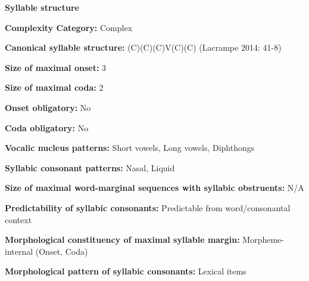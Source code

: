 \begin{styleBody}
\textbf{Syllable structure}
\end{styleBody}

\begin{styleBody}
\textbf{Complexity Category:} Complex
\end{styleBody}

\begin{styleBody}
\textbf{Canonical syllable structure:} (C)(C)(C)V(C)(C)\textbf{ }(Lacrampe 2014: 41-8)
\end{styleBody}

\begin{styleBody}
\textbf{Size of maximal onset:} 3
\end{styleBody}

\begin{styleBody}
\textbf{Size of maximal coda:} 2
\end{styleBody}

\begin{styleBody}
\textbf{Onset obligatory:} No
\end{styleBody}

\begin{styleBody}
\textbf{Coda obligatory:} No
\end{styleBody}

\begin{styleBody}
\textbf{Vocalic nucleus patterns:} Short vowels, Long vowels, Diphthongs
\end{styleBody}

\begin{styleBody}
\textbf{Syllabic consonant patterns:} Nasal, Liquid
\end{styleBody}

\begin{styleBody}
\textbf{Size of maximal word{}-marginal sequences with syllabic obstruents:} N/A
\end{styleBody}

\begin{styleBody}
\textbf{Predictability of syllabic consonants:} Predictable from word/consonantal context
\end{styleBody}

\begin{styleBody}
\textbf{Morphological constituency of maximal syllable margin:} Morpheme-internal (Onset, Coda)
\end{styleBody}

\begin{styleBody}
\textbf{Morphological pattern of syllabic consonants:} Lexical items
\end{styleBody}

